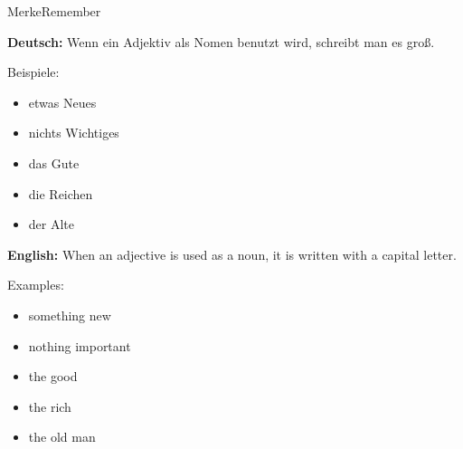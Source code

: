 \documentclass[a4paper,11pt]{article}
\newcommand{\GermanText}[1]{\textbf{Deutsch: }#1\par}
\newcommand{\EnglishText}[1]{{\small\color{SoftGray}\textbf{English: }#1\par}}
\begin{document}
        \begin{grammarentry}{Merke}{Remember}
            
            \GermanText{
                Wenn ein Adjektiv als Nomen benutzt wird,
                schreibt man es gro{\ss}.
                
                Beispiele:
                \begin{itemize}
                    \item etwas Neues
                    \item nichts Wichtiges
                    \item das Gute
                    \item die Reichen
                    \item der Alte
                \end{itemize}
            }
            
            \EnglishText{
                When an adjective is used as a noun,
                it is written with a capital letter.
                
                Examples:
                \begin{itemize}
                    \item something new
                    \item nothing important
                    \item the good
                    \item the rich
                    \item the old man
                \end{itemize}
            }
        
        \end{grammarentry}
\end{document}
